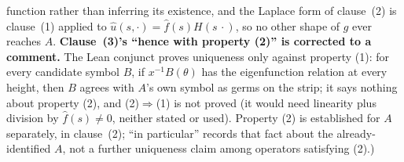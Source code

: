 \begin{theorem}
{function rather than inferring its existence, and the Laplace form of clause~(2) is clause~(1)
applied to $\hat u(s,\cdot) = \hat f(s)H(s\,\cdot)$, so no other shape of $g$ ever reaches $A$.
\textbf{Clause~(3)'s ``hence with property (2)'' is corrected to a comment.} The Lean conjunct
proves uniqueness only against property (1): for every candidate symbol $B$, if $x^{-1}B(\theta)$
has the eigenfunction relation at every height, then $B$ agrees with $A$'s own symbol as germs on
the strip; it says nothing about property (2), and (2)$\Rightarrow$(1) is not proved (it would need
linearity plus division by $\hat f(s) \ne 0$, neither stated or used). Property (2) is established
for $A$ separately, in clause~(2); ``in particular'' records that fact about the already-identified
$A$, not a further uniqueness claim among operators satisfying (2).)}
\end{theorem}

